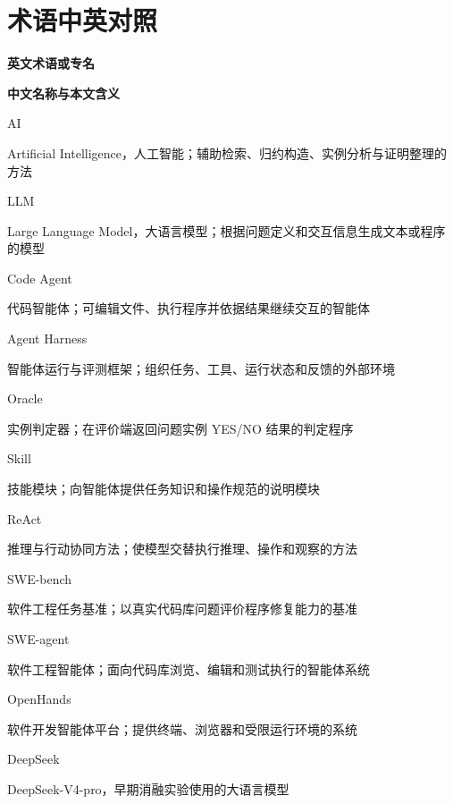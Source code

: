 \intobmk\chapter*{术语中英对照}

\begingroup
\renewcommand{\nomenclatureitem}[3][ ]{%
    \noindent
    \parbox[t]{0.23\textwidth}{#2}\hfill
    \parbox[t]{0.73\textwidth}{#3\hfill#1}\par
    \vspace{0.4ex}%
}

\nomenclatureitem{\textbf{英文术语或专名}}{\textbf{中文名称与本文含义}}

\nomenclatureitem{AI}{Artificial Intelligence，人工智能；辅助检索、归约构造、实例分析与证明整理的方法}
\nomenclatureitem{LLM}{Large Language Model，大语言模型；根据问题定义和交互信息生成文本或程序的模型}
\nomenclatureitem{Code Agent}{代码智能体；可编辑文件、执行程序并依据结果继续交互的智能体}
\nomenclatureitem{Agent Harness}{智能体运行与评测框架；组织任务、工具、运行状态和反馈的外部环境}
\nomenclatureitem{Oracle}{实例判定器；在评价端返回问题实例 YES/NO 结果的判定程序}
\nomenclatureitem{Skill}{技能模块；向智能体提供任务知识和操作规范的说明模块}
\nomenclatureitem{ReAct}{推理与行动协同方法；使模型交替执行推理、操作和观察的方法}
\nomenclatureitem{SWE-bench}{软件工程任务基准；以真实代码库问题评价程序修复能力的基准}
\nomenclatureitem{SWE-agent}{软件工程智能体；面向代码库浏览、编辑和测试执行的智能体系统}
\nomenclatureitem{OpenHands}{软件开发智能体平台；提供终端、浏览器和受限运行环境的系统}
\nomenclatureitem{DeepSeek}{DeepSeek-V4-pro，早期消融实验使用的大语言模型}

\endgroup
